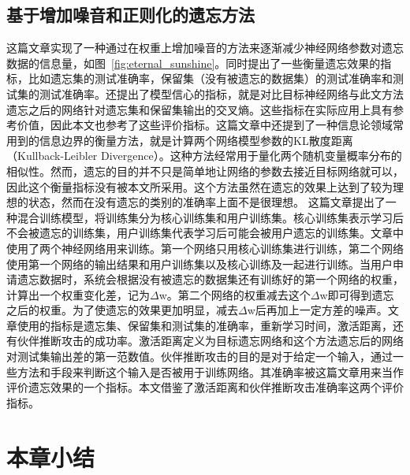 \subsection{基于增加噪音和正则化的遗忘方法}
这篇文章\cite{Golatkar_2020_CVPR}实现了一种通过在权重上增加噪音的方法来逐渐减少神经网络参数对遗忘数据的信息量，如图~\ref{fig:eternal_sunshine}。同时提出了一些衡量遗忘效果的指标，比如遗忘集的测试准确率，保留集（没有被遗忘的数据集）的测试准确率和测试集的测试准确率。还提出了模型信心的指标，就是对比目标神经网络与此文方法遗忘之后的网络针对遗忘集和保留集输出的交叉熵。这些指标在实际应用上具有参考价值，因此本文也参考了这些评价指标。这篇文章中还提到了一种信息论领域常用到的信息边界的衡量方法，就是计算两个网络模型参数的KL散度距离（Kullback-Leibler Divergence）。这种方法经常用于量化两个随机变量概率分布的相似性。然而，遗忘的目的并不只是简单地让网络的参数去接近目标网络就可以，因此这个衡量指标没有被本文所采用。这个方法虽然在遗忘的效果上达到了较为理想的状态，然而在没有遗忘的类别的准确率上面不是很理想。
这篇文章\cite{Golatkar_2021_CVPR}提出了一种混合训练模型，将训练集分为核心训练集和用户训练集。核心训练集表示学习后不会被遗忘的训练集，用户训练集代表学习后可能会被用户遗忘的训练集。文章中使用了两个神经网络用来训练。第一个网络只用核心训练集进行训练，第二个网络使用第一个网络的输出结果和用户训练集以及核心训练及一起进行训练。当用户申请遗忘数据时，系统会根据没有被遗忘的数据集还有训练好的第一个网络的权重，计算出一个权重变化差，记为$\Delta$w。第二个网络的权重减去这个$\Delta$w即可得到遗忘之后的权重。为了使遗忘的效果更加明显，减去$\Delta$w后再加上一定方差的噪声。文章使用的指标是遗忘集、保留集和测试集的准确率，重新学习时间，激活距离，还有伙伴推断攻击的成功率。激活距离定义为目标遗忘网络和这个方法遗忘后的网络对测试集输出差的第一范数值。伙伴推断攻击的目的是对于给定一个输入，通过一些方法和手段来判断这个输入是否被用于训练网络。其准确率被这篇文章用来当作评价遗忘效果的一个指标。本文借鉴了激活距离和伙伴推断攻击准确率这两个评价指标。


\section{本章小结}

